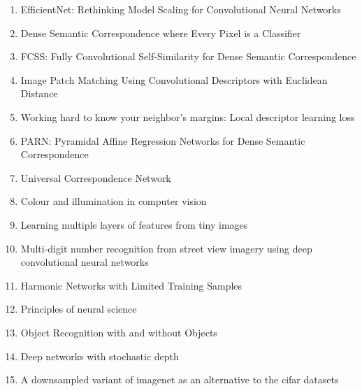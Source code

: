 \documentclass[acmlarge]{acmart}
\begin{document}
\begin{enumerate}
	\item EfficientNet: Rethinking Model Scaling for Convolutional Neural Networks \cite{tan2019efficientnet} 

	\item Dense Semantic Correspondence where Every Pixel is a Classifier \cite{bristow2015dense} 

	\item FCSS: Fully Convolutional Self-Similarity for Dense Semantic Correspondence \cite{kim2017fcss} 

	\item Image Patch Matching Using Convolutional Descriptors with Euclidean Distance \cite{melekhov2017image} 

	\item Working hard to know your neighbor's margins: Local descriptor learning loss \cite{mishchuk2017working} 

	\item PARN: Pyramidal Affine Regression Networks for Dense Semantic Correspondence \cite{jeon2018parn} 

	\item Universal Correspondence Network \cite{choy2016universal} 

	\item Colour and illumination in computer vision \cite{Finlayson2018ColourAI} 

	\item Learning multiple layers of features from tiny images \cite{krizhevsky2009learning} 

	\item Multi-digit number recognition from street view imagery using deep convolutional neural networks \cite{goodfellow2013multi} 

	\item Harmonic Networks with Limited Training Samples \cite{ulicny2019harmonic} 

	\item Principles of neural science \cite{kandel2000principles} 

	\item Object Recognition with and without Objects \cite{zhu2016object} 

	\item Deep networks with stochastic depth \cite{huang2016deep} 

	\item A downsampled variant of imagenet as an alternative to the cifar datasets \cite{chrabaszcz2017downsampled} 


\end{enumerate}
\end{document}
